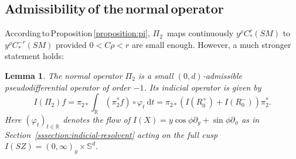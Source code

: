 \documentclass[10pt]{amsart}
\newcommand{\R}{\mathbb{R}}
\newcommand{\Ss}{\mathbb{S}}
\newcommand{\dd}{\mathrm{d}}
\newcommand{\ZZ}{I(SZ)}
\theoremstyle{plain}
\newtheorem{lemma}{Lemma}[section]
\theoremstyle{definition}
\begin{document}
\subsection{Admissibility\,of\,\,the\,normal\,operator}\label{ssection:admissibility}\mbox{}\hspace*{-6pt}
According\,to\,Proposition\,\ref{proposition:pi}, $\Pi_2$~maps continuously $y^\rho C^r_*(SM)$ to $y^\rho C^{-r}_*(SM)$ provided $0< C\rho< r$ are small enough. However, a much stronger statement holds:
\begin{lemma}\label{lemma:Pi2admissible}
The normal operator $\Pi_2$ is a small $(0,d)$-admissible pseudodifferential operator of order $-1$. Its indicial operator is given by
\begin{equation}
\label{eq:indicial-Pi-2}
I(\Pi_2) f = \pi_{2\ast} \int_\R (\pi_2^\ast f)\circ\varphi_t ~\dd t = \pi_{2\ast}(I(R^+_0)+I(R_0^-))\pi_2^\ast.
\end{equation}
Here $(\varphi_t)_{t \in \R}$ denotes the flow of $I(X)= y\cos\phi\partial_y + \sin\phi\partial_\phi$ as in Section~\ref{sssection:indicial-resolvent} acting on the full cusp $\ZZ = (0,\infty)_y \times \Ss^d$.
\end{lemma}
\end{document}
